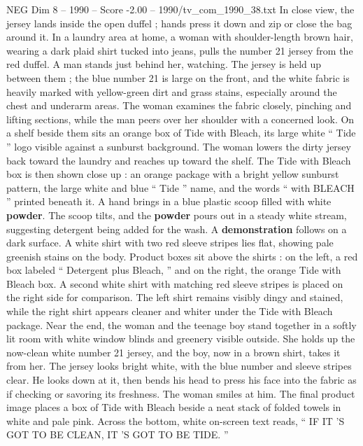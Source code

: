 \begin{textsample}{NEG Dim 8 – 1990 – Score -2.00 – 1990/tv\_com\_1990\_38.txt}
In close view, the jersey lands inside the open duffel ; hands press it down and zip or close the bag around it.
In a laundry area at home, a woman with shoulder-length brown hair, wearing a dark plaid shirt tucked into jeans, pulls the number 21 jersey from the red duffel.
A man stands just behind her, watching.
The jersey is held up between them ; the blue number 21 is large on the front, and the white fabric is heavily marked with yellow-green dirt and grass stains, especially around the chest and underarm areas.
The woman examines the fabric closely, pinching and lifting sections, while the man peers over her shoulder with a concerned look.
On a shelf beside them sits an orange box of Tide with Bleach, its large white “ Tide ” logo visible against a sunburst background.
The woman lowers the dirty jersey back toward the laundry and reaches up toward the shelf.
The Tide with Bleach box is then shown close up : an orange package with a bright yellow sunburst pattern, the large white and blue “ Tide ” name, and the words “ with BLEACH ” printed beneath it.
A hand brings in a blue plastic scoop filled with white \textbf{powder}.
The scoop tilts, and the \textbf{powder} pours out in a steady white stream, suggesting detergent being added for the wash.
A \textbf{demonstration} follows on a dark surface.
A white shirt with two red sleeve stripes lies flat, showing pale greenish stains on the body.
Product boxes sit above the shirts : on the left, a red box labeled “ Detergent plus Bleach, ” and on the right, the orange Tide with Bleach box.
A second white shirt with matching red sleeve stripes is placed on the right side for comparison.
The left shirt remains visibly dingy and stained, while the right shirt appears cleaner and whiter under the Tide with Bleach package.
Near the end, the woman and the teenage boy stand together in a softly lit room with white window blinds and greenery visible outside.
She holds up the now-clean white number 21 jersey, and the boy, now in a brown shirt, takes it from her.
The jersey looks bright white, with the blue number and sleeve stripes clear.
He looks down at it, then bends his head to press his face into the fabric as if checking or savoring its freshness.
The woman smiles at him.
The final product image places a box of Tide with Bleach beside a neat stack of folded towels in white and pale pink.
Across the bottom, white on-screen text reads, “ IF IT ’S GOT TO BE CLEAN, IT ’S GOT TO BE TIDE. ”

\end{textsample}

